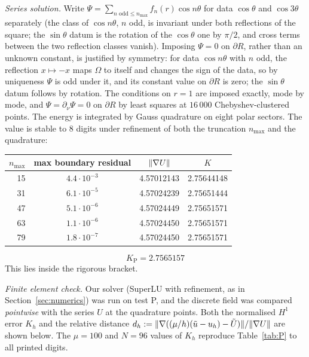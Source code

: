 \emph{Series solution.} Write $\Psi=\sum_{n\text{ odd}\le n_{\max}}f_n(r)\cos n\theta$ for data $\cos\theta$ and $\cos3\theta$ separately (the class of
$\cos n\theta$, $n$ odd, is invariant under both reflections of the square; the $\sin\theta$ datum is the rotation of the
$\cos\theta$ one by $\pi/2$, and cross terms between the two reflection classes vanish). Imposing $\Psi=0$ on $\partial R$, rather than an unknown constant, is justified by symmetry: for data $\cos n\theta$ with $n$ odd, the reflection $x\mapsto-x$ maps $\Omega$ to itself and changes the sign of the data, so by uniqueness $\Psi$ is odd under it, and its constant value on $\partial R$ is zero; the $\sin\theta$ datum follows by rotation. The conditions on $r=1$ are imposed
exactly, mode by mode, and $\Psi=\partial_\nu\Psi=0$ on $\partial R$ by least squares at $16\,000$ Chebyshev-clustered points.
The energy is integrated by Gauss quadrature on eight polar sectors. The value is stable to 8 digits under refinement of both the truncation $n_{\max}$ and the
quadrature:

\begin{center}
\begin{tabular}{rccc}
\toprule
$n_{\max}$ & max boundary residual & $\lVert \nabla U\rVert$ & $K$\\
\midrule
15 & $4.4\cdot10^{-3}$ & 4.57012143 & 2.75644148\\
31 & $6.1\cdot10^{-5}$ & 4.57024239 & 2.75651444\\
47 & $5.1\cdot10^{-6}$ & 4.57024449 & 2.75651571\\
63 & $1.1\cdot10^{-6}$ & 4.57024450 & 2.75651571\\
79 & $1.8\cdot10^{-7}$ & 4.57024450 & 2.75651571\\
\bottomrule
\end{tabular}
\end{center}

\[
\boxed{\,K_{\mathrm P}=2.7565157\,}
\]
This lies inside the rigorous bracket.

\emph{Finite element check.} Our solver (SuperLU with refinement, as in Section~\ref{sec:numerics}) was run on test P, and
the discrete field was compared \emph{pointwise} with the series $U$ at the quadrature points. Both the normalised $H^1$ error
$K_h$ and the relative distance $d_h:=\lVert \nabla((\mu/h)(\tilde u-u_h)-\tilde U)\rVert/\lVert \nabla U\rVert$ are shown below. The $\mu=100$ and
$N=96$ values of $K_h$ reproduce Table~\ref{tab:P} to all printed digits.

